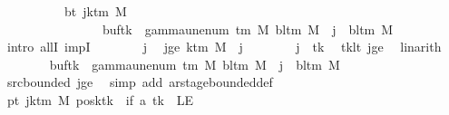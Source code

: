 \begin{isabellebody}
\ \ \isamarkupfalse%
\ {\isacharminus}{\kern0pt}\isanewline
\ \ \ \ \isamarkupfalse%
\ bt{\isacharcolon}{\kern0pt}\ {\isachardoublequoteopen}{\isasymforall}j{\isasymge}k{\isacharunderscore}{\kern0pt}tm\ M{\isachardot}{\kern0pt}\isanewline
\ \ \ \ \ \ \ \ \ \ \ \ \ \ \ \ {\isacharparenleft}{\kern0pt}buf{\isacharparenleft}{\kern0pt}tk\ {\isacharcolon}{\kern0pt}{\isacharequal}{\kern0pt}\ gamma{\isacharunderscore}{\kern0pt}unenum\ {\isacharparenleft}{\kern0pt}{\isasymGamma}{\isacharunderscore}{\kern0pt}tm\ M{\isacharparenright}{\kern0pt}\ {\isacharparenleft}{\kern0pt}bl{\isacharunderscore}{\kern0pt}tm\ M{\isacharparenright}{\kern0pt}\ {}{\isacharparenright}{\kern0pt}{\isacharparenright}{\kern0pt}\ j\ {\isacharequal}{\kern0pt}\ bl{\isacharunderscore}{\kern0pt}tm\ M{\isachardoublequoteclose}\isanewline
\ \ \ \ \isamarkupfalse%
\ {\isacharparenleft}{\kern0pt}intro\ allI\ impI{\isacharparenright}{\kern0pt}\isanewline
\ \ \ \ \ \ \isamarkupfalse%
\ j\ \isamarkupfalse%
\ jge{\isacharcolon}{\kern0pt}\ {\isachardoublequoteopen}k{\isacharunderscore}{\kern0pt}tm\ M\ {\isasymle}\ j{\isachardoublequoteclose}\isanewline
\ \ \ \ \ \ \isamarkupfalse%
\ {\isachardoublequoteopen}j\ {\isasymnoteq}\ tk{\isachardoublequoteclose}\ \isamarkupfalse%
\ tk{\isacharunderscore}{\kern0pt}lt\ jge\ \isamarkupfalse%
\ linarith\isanewline
\ \ \ \ \ \ \isamarkupfalse%
\ {\isachardoublequoteopen}{\isacharparenleft}{\kern0pt}buf{\isacharparenleft}{\kern0pt}tk\ {\isacharcolon}{\kern0pt}{\isacharequal}{\kern0pt}\ gamma{\isacharunderscore}{\kern0pt}unenum\ {\isacharparenleft}{\kern0pt}{\isasymGamma}{\isacharunderscore}{\kern0pt}tm\ M{\isacharparenright}{\kern0pt}\ {\isacharparenleft}{\kern0pt}bl{\isacharunderscore}{\kern0pt}tm\ M{\isacharparenright}{\kern0pt}\ {}{\isacharparenright}{\kern0pt}{\isacharparenright}{\kern0pt}\ j\ {\isacharequal}{\kern0pt}\ bl{\isacharunderscore}{\kern0pt}tm\ M{\isachardoublequoteclose}\isanewline
\ \ \ \ \ \ \ \ \isamarkupfalse%
\ src{\isacharunderscore}{\kern0pt}bounded\ jge\ \isamarkupfalse%
\ {\isacharparenleft}{\kern0pt}simp\ add{\isacharcolon}{\kern0pt}\ ar{\isacharunderscore}{\kern0pt}stage{\isacharunderscore}{\kern0pt}bounded{\isacharunderscore}{\kern0pt}def{\isacharparenright}{\kern0pt}\isanewline
\ \ \ \ \isamarkupfalse%
\isanewline
\ \ \ \ \isamarkupfalse%
\ pt{\isacharcolon}{\kern0pt}\ {\isachardoublequoteopen}{\isasymforall}j{\isasymge}k{\isacharunderscore}{\kern0pt}tm\ M{\isachardot}{\kern0pt}\ {\isacharparenleft}{\kern0pt}posk{\isacharparenleft}{\kern0pt}tk\ {\isacharcolon}{\kern0pt}{\isacharequal}{\kern0pt}\ if\ {\isacharquery}{\kern0pt}a\ tk\ {\isacharequal}{\kern0pt}\ LE{}\isanewline

\end{isabellebody}
